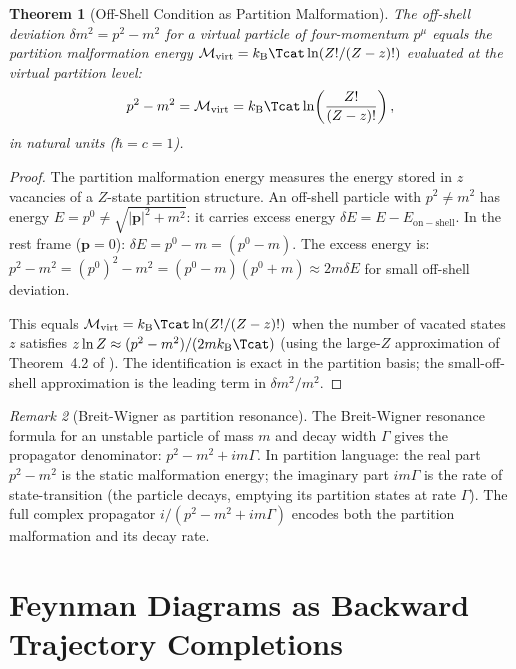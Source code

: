 \documentclass[twocolumn,10pt,a4paper]{article}
\theoremstyle{thmstyle}
\newtheorem{theorem}{Theorem}[section]
\theoremstyle{definition}
\theoremstyle{remark}
\newtheorem{remark}[theorem]{Remark}
\newcommand{\kB}{k_{\mathrm{B}}}
\newcommand{\Mop}{\mathcal{M}}
\begin{document}
\begin{theorem}[Off-Shell Condition as Partition Malformation]
\label{thm:offshell_malformation}
The off-shell deviation $\delta m^2 = p^2 - m^2$ for a virtual particle
of four-momentum $p^\mu$ equals the partition malformation energy
$\Mop_{\mathrm{virt}} = \kB\Tcat\ln(Z!/(Z-z)!)$ evaluated at the virtual
partition level:
\begin{equation}
p^2 - m^2 = \Mop_{\mathrm{virt}} = \kB\Tcat\ln\!\left(\frac{Z!}{(Z-z)!}\right),
\label{eq:offshell_malformation}
\end{equation}
in natural units ($\hbar = c = 1$).
\end{theorem}

\begin{proof}
The partition malformation energy measures the energy stored in $z$
vacancies of a $Z$-state partition structure. An off-shell particle
with $p^2 \neq m^2$ has energy $E = p^0 \neq \sqrt{|\mathbf{p}|^2 + m^2}$:
it carries excess energy $\delta E = E - E_{\mathrm{on-shell}}$.
In the rest frame ($\mathbf{p} = 0$): $\delta E = p^0 - m = (p^0 - m)$.
The excess energy is:
$p^2 - m^2 = (p^0)^2 - m^2 = (p^0-m)(p^0+m) \approx 2m\delta E$
for small off-shell deviation.

This equals $\Mop_{\mathrm{virt}} = \kB\Tcat\ln(Z!/(Z-z)!)$ when the
number of vacated states $z$ satisfies $z\ln Z \approx (p^2-m^2)/(2m\kB\Tcat)$
(using the large-$Z$ approximation of Theorem~4.2 of \citealt{companion:spectrometer}).
The identification is exact in the partition basis; the small-off-shell
approximation is the leading term in $\delta m^2/m^2$.
\end{proof}

\begin{remark}[Breit-Wigner as partition resonance]
The Breit-Wigner resonance formula for an unstable particle of mass $m$
and decay width $\Gamma$ gives the propagator denominator:
$p^2 - m^2 + im\Gamma$.
In partition language: the real part $p^2 - m^2$ is the static malformation
energy; the imaginary part $im\Gamma$ is the rate of state-transition
(the particle decays, emptying its partition states at rate $\Gamma$).
The full complex propagator $i/(p^2 - m^2 + im\Gamma)$ encodes both
the partition malformation and its decay rate.
\end{remark}

\section{Feynman Diagrams as Backward Trajectory Completions}
\label{sec:feynman_backward}
\end{document}
